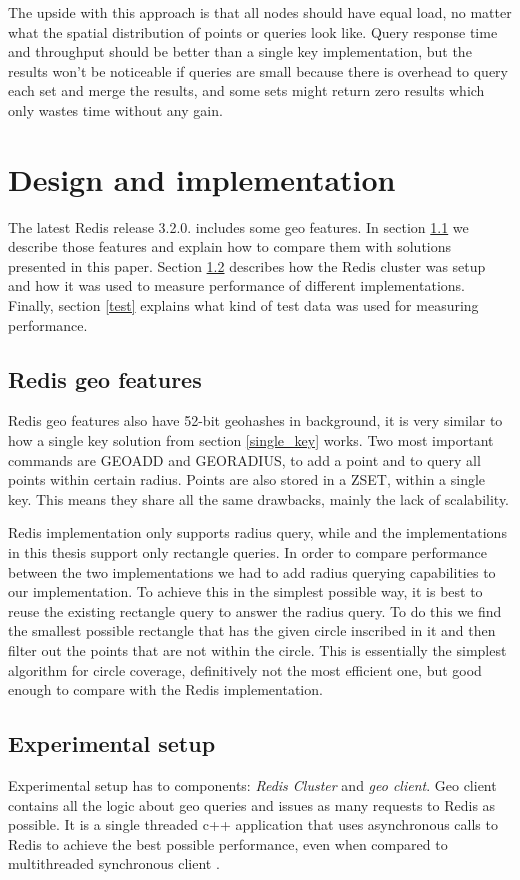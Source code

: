 \documentclass[times, utf8, diplomski]{fer}
\begin{document}
The upside with this approach is that all nodes should have equal load, no matter what the spatial distribution of points or queries look like. Query response time and throughput should be better than a single key implementation, but the results won't be noticeable if queries are small because there is overhead to query each set and merge the results, and some sets might return zero results which only wastes time without any gain.

\chapter {Design and implementation}
The latest Redis release 3.2.0. includes some geo features. In section \ref{redis_geo} we describe those features and explain how to compare them with solutions presented in this paper. Section \ref{setup} describes how the Redis cluster was setup and how it was used to measure performance of different implementations. Finally, section \ref{test} explains what kind of test data was used for measuring performance.

\section {Redis geo features} \label{redis_geo}
Redis geo features also have 52-bit geohashes in background, it is very similar to how a single key solution from section \ref{single_key} works. Two most important commands are GEOADD and GEORADIUS, to add a point and to query all points within certain radius. Points are also stored in a ZSET, within a single key. This means they share all the same drawbacks, mainly the lack of scalability.

Redis implementation only supports radius query, while and the implementations in this thesis support only rectangle queries. In order to compare performance between the two implementations we had to add radius querying capabilities to our implementation. To achieve this in the simplest possible way, it is best to reuse the existing rectangle query to answer the radius query. To do this we find the smallest possible rectangle that has the given circle inscribed in it and then filter out the points that are not within the circle. This is essentially the simplest algorithm for circle coverage, definitively not the most efficient one, but good enough to compare with the Redis implementation.

\section {Experimental setup} \label{setup}
Experimental setup has to components: \emph{Redis Cluster} and \emph{geo client}. Geo client contains all the logic about geo queries and issues as many requests to Redis as possible. It is a single threaded c++ application that uses asynchronous calls to Redis to achieve the best possible performance, even when compared to multithreaded synchronous client \cite{clientperf}.
\end{document}
